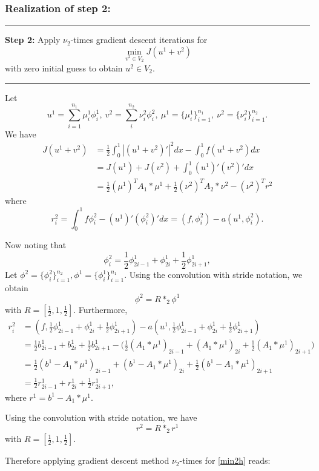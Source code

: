 \subsubsection{Realization of step 2:} 
\smallskip\hrule \smallskip 
{\bf Step 2:}   Apply $\nu_2$-times gradient descent iterations for 
$$
\min_{v^2\in V_2} J(u^1+v^2)
$$
with zero initial guess to obtain $u^2\in V_2$. 
\smallskip\hrule \smallskip  
Let 
$$
u^1=\sum_{i=1}^{n_1}\mu^1_i\phi_i^1,~v^2=\sum_{i}^{n_2}\nu^2_{i}\phi^{2}_i,~\mu^1=\{\mu^1_i\}^{n_1}_{i=1}, ~ \nu^2=\{\nu^2_{i}\}^{n_2}_{i=1}.$$
We have
\begin{equation}\label{min2h} 
\begin{aligned}
J(u^1+v^2)&=\frac12\int_0^1|(u^1+v^2)'|^2dx-\int_0^1f(u^1+v^2)dx\\
&=J(u^1)+J(v^2)+\int_0^1(u^1)'(v^2)'dx\\
&=\frac12 (\mu^1)^TA_1\ast \mu^1+\frac12 (\nu^2)^TA_2\ast\nu^2-(\nu^2)^Tr^2
\end{aligned}
\end{equation}
where 
\begin{equation}
r_i^2=\int_0^1 f\phi^2_i -(u^1)'(\phi^2_i)'dx=(f,\phi^2_i)-a(u^1,\phi^2_i).
\end{equation}

Now noting that 
\begin{equation}\label{prolongation}
\phi^2_i=\frac12 \phi^1_{2i-1}+ \phi^1_{2i} +\frac12 \phi^1_{2i+1},
\end{equation}
Let $\phi^2=\{\phi^2_i\}_{i=1}^{n_2}, \phi^1=\{\phi^1_i\}_{i=1}^{n_1}$. 
Using the convolution with stride notation,  we obtain 
\begin{equation}\label{rescon}
\phi^2=R\ast_2\phi^1
\end{equation}
with $R=[\frac12,1,\frac12]$.
Furthermore, 
\begin{equation}
\begin{aligned}
r^2_i&=(f, \frac12 \phi^1_{2i-1}+ \phi^1_{2i} +\frac12 \phi^1_{2i+1})-a(u^1,  \frac12 \phi^1_{2i-1}+ \phi^1_{2i} +\frac12 \phi^1_{2i+1})\\
&\displaystyle= \frac12 b^1_{2i-1}+ b^1_{2i} +\frac12 b^1_{2i+1}- \Big(\frac12 (A_1\ast\mu^1)_{2i-1}+   (A_1\ast\mu^1)_{2i}+ \frac12(A_1\ast\mu^1)_{2i+1}\Big)\\
&\displaystyle= \frac12 (b^1-A_1\ast\mu^1)_{2i-1}+ (b^1-A_1\ast\mu^1)_{2i}+\frac12 (b^1-A_1\ast\mu^1)_{2i+1}\\
&\displaystyle= \frac12 r^1_{2i-1}+ r^1_{2i} +\frac12 r^1_{2i+1},
\end{aligned}
\end{equation}
where $r^1=b^1-A_1\ast\mu^1$.
\begin{lemma}
Using the convolution with stride notation, we have $$r^2=R\ast_2r^1$$ with $R=[\frac12,1,\frac12]$.
\end{lemma}
Therefore applying gradient descent method $\nu_2$-times for \eqref{min2h} reads: 

